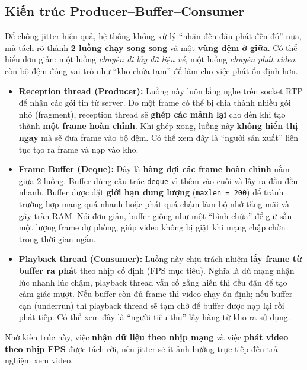 \subsection{Kiến trúc Producer--Buffer--Consumer}
Để chống jitter hiệu quả, hệ thống không xử lý ``nhận đến đâu phát đến đó'' nữa, mà tách rõ thành \textbf{2 luồng chạy song song} và một \textbf{vùng đệm ở giữa}. Có thể hiểu đơn giản: một luồng \textit{chuyên đi lấy dữ liệu về}, một luồng \textit{chuyên phát video}, còn bộ đệm đóng vai trò như ``kho chứa tạm'' để làm cho việc phát ổn định hơn.
\begin{itemize}
    \item \textbf{Reception thread (Producer):} Luồng này luôn lắng nghe trên socket RTP để nhận các gói tin từ server. Do một frame có thể bị chia thành nhiều gói nhỏ (fragment), reception thread sẽ \textbf{ghép các mảnh lại} cho đến khi tạo thành \textbf{một frame hoàn chỉnh}. Khi ghép xong, luồng này \textbf{không hiển thị ngay} mà sẽ đưa frame vào bộ đệm. Có thể xem đây là ``người sản xuất'' liên tục tạo ra frame và nạp vào kho.
    \item \textbf{Frame Buffer (Deque):} Đây là \textbf{hàng đợi các frame hoàn chỉnh} nằm giữa 2 luồng. Buffer dùng cấu trúc \texttt{deque} vì thêm vào cuối và lấy ra đầu đều nhanh. Buffer được đặt \textbf{giới hạn dung lượng} (\texttt{maxlen = 200}) để tránh trường hợp mạng quá nhanh hoặc phát quá chậm làm bộ nhớ tăng mãi và gây tràn RAM. Nói đơn giản, buffer giống như một ``bình chứa'' để giữ sẵn một lượng frame dự phòng, giúp video không bị giật khi mạng chập chờn trong thời gian ngắn.
    \item \textbf{Playback thread (Consumer):} Luồng này chịu trách nhiệm \textbf{lấy frame từ buffer ra phát} theo nhịp cố định (FPS mục tiêu). Nghĩa là dù mạng nhận lúc nhanh lúc chậm, playback thread vẫn cố gắng hiển thị đều đặn để tạo cảm giác mượt. Nếu buffer còn đủ frame thì video chạy ổn định; nếu buffer cạn (underrun) thì playback thread sẽ tạm chờ để buffer được nạp lại rồi phát tiếp. Có thể xem đây là ``người tiêu thụ'' lấy hàng từ kho ra sử dụng.
\end{itemize}
Nhờ kiến trúc này, việc \textbf{nhận dữ liệu theo nhịp mạng} và việc \textbf{phát video theo nhịp FPS} được tách rời, nên jitter sẽ ít ảnh hưởng trực tiếp đến trải nghiệm xem video.



